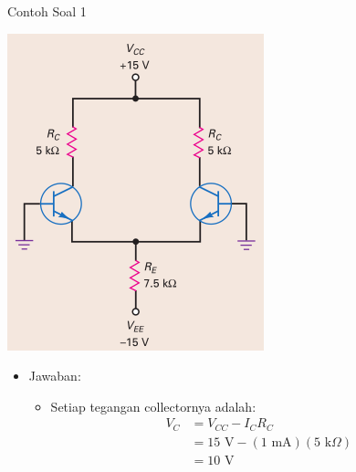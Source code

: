 \documentclass[aspectratio=169]{beamer}
\begin{document}
\begin{frame}{Contoh Soal 1}
	\begin{multicols}{2}
		\begin{center}
			\includegraphics[width=0.6\textheight]{gambar/01.diff-amp/01.latihan_soal_1a}
		\end{center}
		\columnbreak
		\begin{itemize}
			\item Jawaban:
			\begin{itemize}
				\item Setiap tegangan collectornya adalah:
				\begin{align*}
					V_C &= V_{CC} - I_C R_C \\
					&= 15 \text{ V} - (1 \text{ mA})(5 \text{ k}\Omega) \\
					&= 10 \text{ V}
				\end{align*}
				\[  \]
			\end{itemize}
		\end{itemize}
		\vfill\null
	\end{multicols}
\end{frame}
\end{document}
